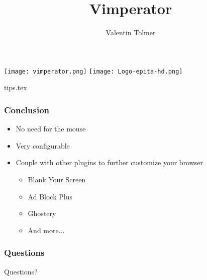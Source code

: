\documentclass{beamer}
\title{Vimperator}
\author{Valentin Tolmer}
\date{}
\institute{GCONFS -- EPITA 2013}
\newlength{\wideitemsep}
\let\olditem\item
\renewcommand{\item}{\setlength{\itemsep}{\wideitemsep}\olditem}
\begin{document}
\begin{frame}
  \titlepage
    \texttt{[image: vimperator.png]}
    \hfill
    \texttt{[image: Logo-epita-hd.png]}
\end{frame}

\begin{frame}
  \tableofcontents[pausesections ]
\end{frame}





 {tips.tex}

\begin{frame}
  \frametitle{Conclusion}
  \begin{itemize}[<+->]
    \item No need for the mouse
    \item Very configurable
    \item Couple with other plugins to further customize your browser
      \begin{itemize}
        \item Blank Your Screen
        \item Ad Block Plus
        \item Ghostery
        \item And more...
      \end{itemize}
  \end{itemize}
\end{frame}

\begin{frame}
\frametitle{Questions}
  Questions?
\end{frame}
\end{document}

